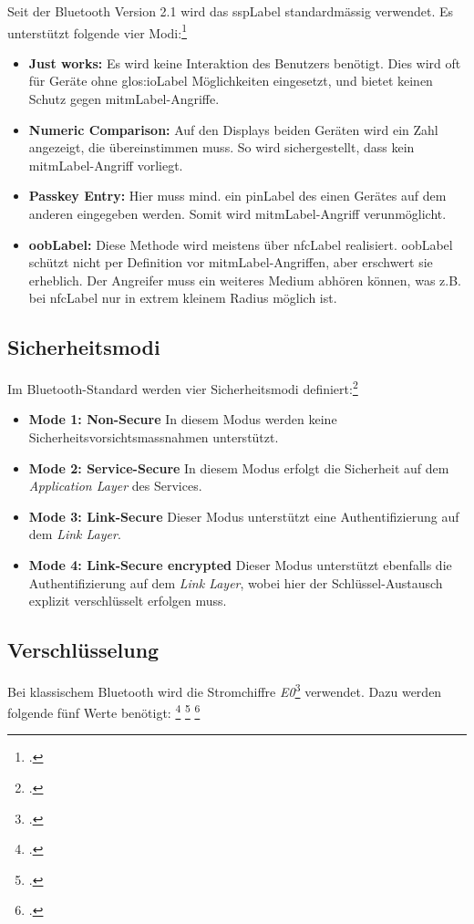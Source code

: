 Seit der Bluetooth Version 2.1 wird das \gls{sspLabel} standardmässig verwendet. Es unterstützt folgende vier Modi:\footcite{Bluetooth_Wikipedia_2015-04-17}
\begin{itemize}
	\item \textbf{Just works:} Es wird keine Interaktion des Benutzers benötigt. Dies wird oft für Geräte ohne \gls{glos:ioLabel} Möglichkeiten eingesetzt, und bietet keinen Schutz gegen \gls{mitmLabel}-Angriffe.
	\item \textbf{Numeric Comparison:} Auf den Displays beiden Geräten wird ein Zahl angezeigt, die übereinstimmen muss. So wird sichergestellt, dass kein \gls{mitmLabel}-Angriff vorliegt.
	\item \textbf{Passkey Entry:} Hier muss mind. ein \gls{pinLabel} des einen Gerätes auf dem anderen eingegeben werden. Somit wird \gls{mitmLabel}-Angriff verunmöglicht.
	\item \textbf{\gls{oobLabel}:} Diese Methode wird meistens über \gls{nfcLabel} realisiert.
		\gls{oobLabel} schützt nicht per Definition vor \gls{mitmLabel}-Angriffen, aber erschwert sie erheblich. Der Angreifer muss ein weiteres Medium abhören können, was z.B. bei \gls{nfcLabel} nur in extrem kleinem Radius möglich ist.
\end{itemize}


\subsection{Sicherheitsmodi}
Im Bluetooth-Standard werden vier Sicherheitsmodi definiert:\footcite{Security_Bluetooth_Development_Portal_2015-04-24}
\begin{itemize}
	\item \textbf{Mode 1: Non-Secure} In diesem Modus werden keine Sicherheitsvorsichtsmassnahmen unterstützt.
	\item \textbf{Mode 2: Service-Secure} In diesem Modus erfolgt die Sicherheit auf dem \textit{Application Layer} des Services.
	\item \textbf{Mode 3: Link-Secure} Dieser Modus unterstützt eine Authentifizierung auf dem \textit{Link Layer}.
	\item \textbf{Mode 4: Link-Secure encrypted} Dieser Modus unterstützt ebenfalls die Authentifizierung auf dem \textit{Link Layer}, wobei hier der Schlüssel-Austausch explizit verschlüsselt erfolgen muss.
\end{itemize}

\subsection{Verschlüsselung}
Bei klassischem Bluetooth wird die Stromchiffre \textit{E0}\footcite{E0_cipher_Wikipedia_2015-04-27} verwendet.
Dazu werden folgende fünf Werte benötigt:
\footcite{LE_Security_Bluetooth_Development_Portal_2015-04-25}
\footcite{Bluetooth_Communication_Hybrid_Encryption_2015-04-25}
\footcite{BluetoothSecurity_Washington_2015-04-25}

